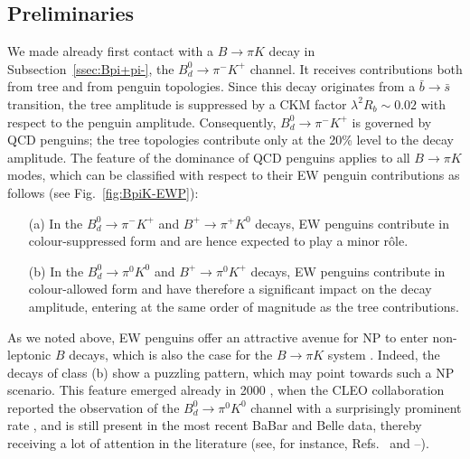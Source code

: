 \documentclass[11pt]{cernrep}
\begin{document}
\subsection{Preliminaries}\label{ssec:BpiK-prel}
%
%
%
We made already first contact with a $B\to\pi K$ decay in 
Subsection~\ref{ssec:Bpi+pi-}, the $B^0_d\to\pi^-K^+$ channel. It receives
contributions both from tree and from penguin topologies. Since this decay
originates from a $\bar b\to\bar s$ transition, the tree amplitude is suppressed
by a CKM factor $\lambda^2 R_b\sim 0.02$ with respect to the penguin
amplitude. Consequently, $B^0_d\to\pi^-K^+$ is governed by QCD penguins;
the tree topologies contribute only at the 20\% level to the decay amplitude.
The feature of the dominance of QCD penguins applies to all $B\to\pi K$ modes, 
which can be classified with respect to their EW penguin contributions 
as follows (see Fig.~\ref{fig:BpiK-EWP}):
\begin{itemize}
\item[(a)] In the $B^0_d\to\pi^-K^+$ and $B^+\to\pi^+K^0$ decays, EW penguins 
contribute in colour-suppressed form and are hence expected to play a minor r\^ole.
\item[(b)] In the $B^0_d\to\pi^0K^0$ and $B^+\to\pi^0K^+$ decays, EW penguins 
contribute in colour-allowed form and have therefore a significant impact on the decay 
amplitude, entering at the same order of magnitude as the tree contributions.
\end{itemize}
As we noted above, EW penguins offer an attractive avenue for NP to 
enter non-leptonic $B$ decays, which is also the case for the
$B\to\pi K$ system \cite{FM-BpiK-NP,trojan}. Indeed, the decays of class (b) 
show a puzzling pattern, which may point towards such a NP scenario.
This feature emerged already in 2000 \cite{BF00}, when the CLEO collaboration 
reported the observation of the $B^0_d\to\pi^0K^0$ channel with a surprisingly 
prominent rate \cite{CLEO00}, and is still present in the most recent BaBar and 
Belle data, thereby receiving a lot of attention in the literature (see, for instance, 
Refs.~\cite{Z-prime-BpiK} and \cite{BeNe}--\cite{WZ}).
\end{document}
